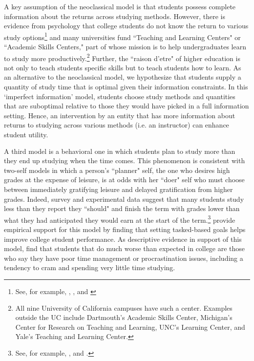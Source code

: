 \documentclass[12pt]{article}
\begin{document}
A key assumption of the neoclassical model is that students possess complete information about the returns across studying methods. However, there is evidence from psychology that college students do not know the return to various study options\footnote{See, for example, \textcite{mccabe2011}, \textcite{prcc2007}, and \textcite{drmnw2013}} and many universities fund ``Teaching and Learning Centers" or ``Academic Skills Centers," part of whose mission is to help undergraduates learn to study more productively.\footnote{All nine University of California campuses have such a center. Examples outside the UC include Dartmouth's Academic Skills Center, Michigan's Center for Research on Teaching and Learning, UNC's Learning Center, and Yale's Teaching and Learning Center.} Further, the ``raison d'etre" of higher education is not only to teach students specific skills but to teach students how to learn. As an alternative to the neoclassical model, we hypothesize that students supply a quantity of study time that is optimal given their information constraints. In this `imperfect information' model, students choose study methods and quantities that are suboptimal relative to those they would have picked in a full information setting. Hence, an intervention by an entity that has more information about returns to studying across various methods (i.e. an instructor) can enhance student utility.

A third model is a behavioral one in which students plan to study more than they end up studying when the time comes. This phenomenon is consistent with two-self models in which a person's ``planner" self, the one who desires high grades at the expense of leisure, is at odds with her ``doer" self who must choose between immediately gratifying leisure and delayed gratification from higher grades. Indeed, survey and experimental data suggest that many students study less than they report they ``should" and finish the term with grades lower than what they had anticipated they would earn at the start of the term.\footnote{See, for example, \textcite{ferrari1992}, \textcite{ccog2017} and \textcite{lo2016}.} \textcite{cgpr2020} provide empirical support for this model by finding that setting tasked-based goals helps improve college student performance. As descriptive evidence in support of this model, \textcite{blmo2019} find that students that do much worse than expected in college are those who say they have poor time management or procrastination issues, including a tendency to cram and spending very little time studying.
\end{document}

